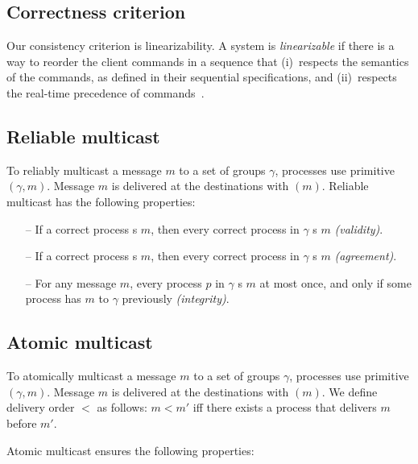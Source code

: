 \subsection{Correctness criterion}

Our consistency criterion is linearizability.  A system is
\emph{linearizable} if there is a way to reorder the client commands
in a sequence that (i)~respects the semantics of the commands, as
defined in their sequential specifications, and (ii)~respects the
real-time precedence of commands~\cite{Attiya04}.


\subsection{Reliable multicast}
\label{sec:rmcast}

To reliably multicast a message $m$ to a set of groups $\gamma$,
processes use primitive \rmcast$(\gamma, m)$.  Message $m$ is
delivered at the destinations with \rmdel$(m)$.  Reliable multicast
has the following properties:

\begin{itemize}

    \item[--] If a correct process \rmcast{}s $m$, then every correct
      process in $\gamma$ \rmdel{}s $m$ \emph{(validity)}.
    
    \item[--] If a correct process \rmdel{}s $m$, then every correct
      process in $\gamma$ \rmdel{}s $m$ \emph{(agreement)}.
    
    \item[--] For any message $m$, every process $p$ in $\gamma$
      \rmdel{}s $m$ at most once, and only if some process has
      \rmcast{} $m$ to $\gamma$ previously \emph{(integrity)}.
    
\end{itemize}

\subsection{Atomic multicast}
\label{sec:amcast}

To atomically multicast a message $m$ to a set of groups $\gamma$,
processes use primitive \amcast$(\gamma, m)$.  Message $m$ is
delivered at the destinations with \amdel$(m)$.  We define delivery
order $<$ as follows: $m < m'$ iff there exists a process that
delivers $m$ before $m'$.

Atomic multicast ensures the following properties:

